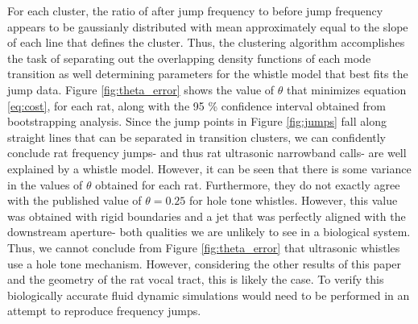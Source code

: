 \documentclass[twocolumn, prl]{revtex4}
\begin{document}
For each cluster, the ratio of after jump frequency to before jump frequency appears to be gaussianly distributed with mean approximately equal to the slope of each line that defines the cluster. Thus, the clustering algorithm accomplishes the task of separating out the overlapping density functions of each mode transition as well determining parameters for the whistle model that best fits the jump data. Figure \ref{fig:theta_error} shows the value of $\theta$ that minimizes equation \ref{eq:cost}, for each rat, along with the 95 \% confidence interval obtained from bootstrapping analysis. Since the jump points in Figure \ref{fig:jumps} fall along straight lines that can be separated in transition clusters, we can confidently conclude rat frequency jumps- and thus rat ultrasonic narrowband calls- are well explained by a whistle model. However, it can be seen that there is some variance in the values of $\theta$ obtained for each rat. Furthermore, they do not exactly agree with the published value of $\theta=0.25$ for hole tone whistles. However, this value was obtained with rigid boundaries and a jet that was perfectly aligned with the downstream aperture- both qualities we are unlikely to see in a biological system. Thus, we cannot conclude from Figure \ref{fig:theta_error} that ultrasonic whistles use a hole tone mechanism. However, considering the other results of this paper and the geometry of the rat vocal tract, this is likely the case. To verify this biologically accurate fluid dynamic simulations would need to be performed in an attempt to reproduce frequency jumps. 
\end{document}
